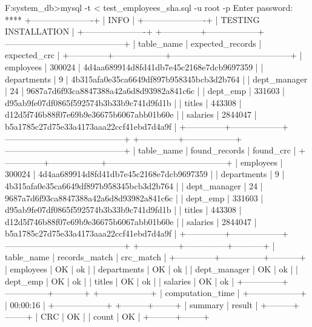 F:\OneDrive\USTH{}\Information system\test_db>mysql -t < test_employees_sha.sql -u root -p
Enter password: ****
+----------------------+
| INFO                 |
+----------------------+
| TESTING INSTALLATION |
+----------------------+
+--------------+------------------+------------------------------------------+
| table_name   | expected_records | expected_crc                             |
+--------------+------------------+------------------------------------------+
| employees    |           300024 | 4d4aa689914d8fd41db7e45c2168e7dcb9697359 |
| departments  |                9 | 4b315afa0e35ca6649df897b958345bcb3d2b764 |
| dept_manager |               24 | 9687a7d6f93ca8847388a42a6d8d93982a841c6c |
| dept_emp     |           331603 | d95ab9fe07df0865f592574b3b33b9c741d9fd1b |
| titles       |           443308 | d12d5f746b88f07e69b9e36675b6067abb01b60e |
| salaries     |          2844047 | b5a1785c27d75e33a4173aaa22ccf41ebd7d4a9f |
+--------------+------------------+------------------------------------------+
+--------------+------------------+------------------------------------------+
| table_name   | found_records    | found_crc                                |
+--------------+------------------+------------------------------------------+
| employees    |           300024 | 4d4aa689914d8fd41db7e45c2168e7dcb9697359 |
| departments  |                9 | 4b315afa0e35ca6649df897b958345bcb3d2b764 |
| dept_manager |               24 | 9687a7d6f93ca8847388a42a6d8d93982a841c6c |
| dept_emp     |           331603 | d95ab9fe07df0865f592574b3b33b9c741d9fd1b |
| titles       |           443308 | d12d5f746b88f07e69b9e36675b6067abb01b60e |
| salaries     |          2844047 | b5a1785c27d75e33a4173aaa22ccf41ebd7d4a9f |
+--------------+------------------+------------------------------------------+
+--------------+---------------+-----------+
| table_name   | records_match | crc_match |
+--------------+---------------+-----------+
| employees    | OK            | ok        |
| departments  | OK            | ok        |
| dept_manager | OK            | ok        |
| dept_emp     | OK            | ok        |
| titles       | OK            | ok        |
| salaries     | OK            | ok        |
+--------------+---------------+-----------+
+------------------+
| computation_time |
+------------------+
| 00:00:16         |
+------------------+
+---------+--------+
| summary | result |
+---------+--------+
| CRC     | OK     |
| count   | OK     |
+---------+--------+